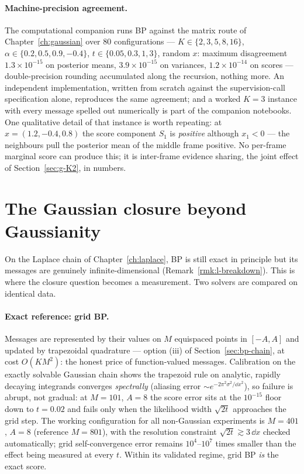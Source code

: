 \paragraph{Machine-precision agreement.} The computational companion runs
BP against the matrix route of Chapter~\ref{ch:gaussian} over $80$
configurations --- $K \in \{2,3,5,8,16\}$, $\alpha \in \{0.2, 0.5, 0.9,
-0.4\}$, $t \in \{0.05, 0.3, 1, 3\}$, random $x$: maximum disagreement
$1.3 \times 10^{-15}$ on posterior means, $3.9 \times 10^{-15}$ on
variances, $1.2 \times 10^{-14}$ on scores --- double-precision rounding
accumulated along the recursion, nothing more. An independent
implementation, written from scratch against the supervision-call
specification alone, reproduces the same agreement; and a worked $K = 3$
instance with every message spelled out numerically is part of the
companion notebooks. One qualitative detail of that instance is worth
repeating: at $x = (1.2, -0.4, 0.8)$ the score component $S_1$ is
\emph{positive} although $x_1 < 0$ --- the neighbours pull the posterior
mean of the middle frame positive. No per-frame marginal score can produce
this; it is inter-frame evidence sharing, the joint effect of
Section~\ref{sec:g-K2}, in numbers.

\section{The Gaussian closure beyond Gaussianity}\label{sec:bp-nongaussian}

On the Laplace chain of Chapter~\ref{ch:laplace}, BP is still exact in
principle but its messages are genuinely infinite-dimensional
(Remark~\ref{rmk:l-breakdown}). This is where the closure question becomes
a measurement. Two solvers are compared on identical data.

\paragraph{Exact reference: grid BP.} Messages are represented by their
values on $M$ equispaced points in $[-A, A]$ and updated by trapezoidal
quadrature --- option (iii) of Section~\ref{sec:bp-chain}, at cost
$O(K M^2)$: the honest price of function-valued messages. Calibration on
the exactly solvable Gaussian chain shows the trapezoid rule on analytic,
rapidly decaying integrands converges \emph{spectrally} (aliasing error
$\sim e^{-2\pi^2 \sigma^2/\dd x^2}$), so failure is abrupt, not gradual:
at $M = 101$, $A = 8$ the score error sits at the $10^{-15}$ floor down to
$t = 0.02$ and fails only when the likelihood width $\sqrt{2t}$ approaches
the grid step. The working configuration for all non-Gaussian experiments
is $M = 401$, $A = 8$ (reference $M = 801$), with the resolution
constraint $\sqrt{2t} \gtrsim 3\,\dd x$ checked automatically; grid
self-convergence error remains $10^4$--$10^7$ times smaller than the
effect being measured at every $t$. Within its validated regime, grid BP
\emph{is} the exact score.

